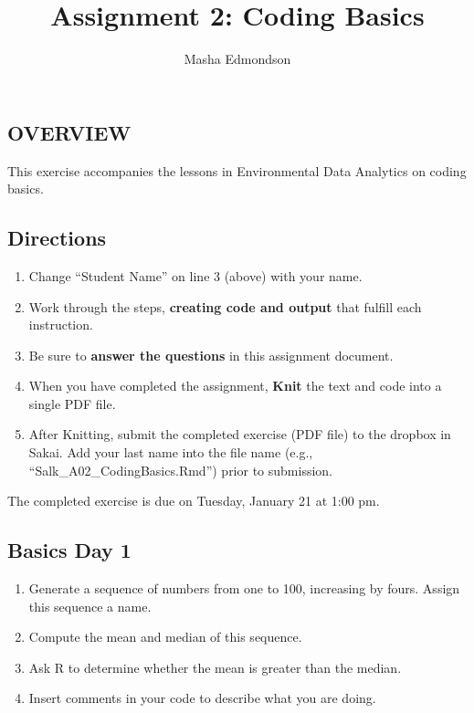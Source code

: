 \documentclass[]{article}
\title{Assignment 2: Coding Basics}
\author{Masha Edmondson}
\date{}
\providecommand{\tightlist}{%
  \setlength{\itemsep}{0pt}\setlength{\parskip}{0pt}}
\begin{document}
\maketitle

\hypertarget{overview}{%
\subsection{OVERVIEW}\label{overview}}

This exercise accompanies the lessons in Environmental Data Analytics on
coding basics.

\hypertarget{directions}{%
\subsection{Directions}\label{directions}}

\begin{enumerate}
\def\labelenumi{\arabic{enumi}.}
\tightlist
\item
  Change ``Student Name'' on line 3 (above) with your name.
\item
  Work through the steps, \textbf{creating code and output} that fulfill
  each instruction.
\item
  Be sure to \textbf{answer the questions} in this assignment document.
\item
  When you have completed the assignment, \textbf{Knit} the text and
  code into a single PDF file.
\item
  After Knitting, submit the completed exercise (PDF file) to the
  dropbox in Sakai. Add your last name into the file name (e.g.,
  ``Salk\_A02\_CodingBasics.Rmd'') prior to submission.
\end{enumerate}

The completed exercise is due on Tuesday, January 21 at 1:00 pm.

\hypertarget{basics-day-1}{%
\subsection{Basics Day 1}\label{basics-day-1}}

\begin{enumerate}
\def\labelenumi{\arabic{enumi}.}
\item
  Generate a sequence of numbers from one to 100, increasing by fours.
  Assign this sequence a name.
\item
  Compute the mean and median of this sequence.
\item
  Ask R to determine whether the mean is greater than the median.
\item
  Insert comments in your code to describe what you are doing.
\end{enumerate}
\end{document}
